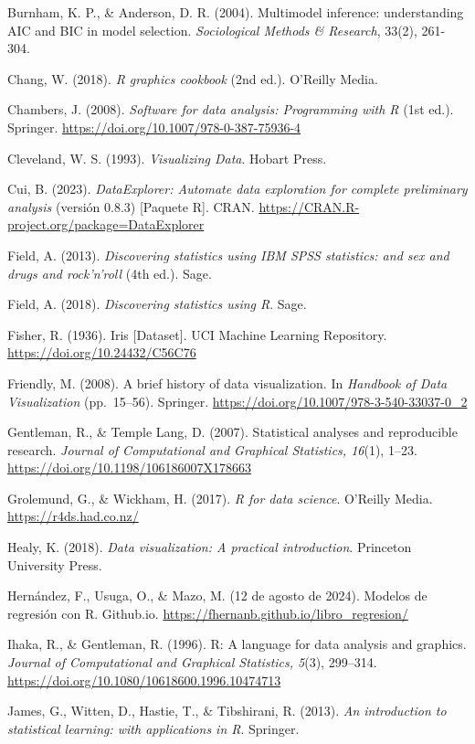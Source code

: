 \documentclass[
  spanish,
  a4paper,
  DIV=11,
  numbers=noendperiod,
  onepage,
  openany]{scrreprt}
\begin{document}
Burnham, K. P., \& Anderson, D. R. (2004). Multimodel inference:
understanding AIC and BIC in model selection. \emph{Sociological Methods
\& Research}, 33(2), 261-304.

Chang, W. (2018). \emph{R graphics cookbook} (2nd ed.). O'Reilly Media.

Chambers, J. (2008). \emph{Software for data analysis: Programming with
R} (1st ed.). Springer. \url{https://doi.org/10.1007/978-0-387-75936-4}

Cleveland, W. S. (1993). \emph{Visualizing Data}. Hobart Press.

Cui, B. (2023). \emph{DataExplorer: Automate data exploration for
complete preliminary analysis} (versión 0.8.3) {[}Paquete R{]}. CRAN.
\url{https://CRAN.R-project.org/package=DataExplorer}

Field, A. (2013). \emph{Discovering statistics using IBM SPSS
statistics: and sex and drugs and rock'n'roll} (4th ed.). Sage.

Field, A. (2018). \emph{Discovering statistics using R}. Sage.

Fisher, R. (1936). Iris {[}Dataset{]}. UCI Machine Learning Repository.
\url{https://doi.org/10.24432/C56C76}

Friendly, M. (2008). A brief history of data visualization. In
\emph{Handbook of Data Visualization} (pp.~15--56). Springer.
\url{https://doi.org/10.1007/978-3-540-33037-0_2}

Gentleman, R., \& Temple Lang, D. (2007). Statistical analyses and
reproducible research. \emph{Journal of Computational and Graphical
Statistics, 16}(1), 1--23.
\url{https://doi.org/10.1198/106186007X178663}

Grolemund, G., \& Wickham, H. (2017). \emph{R for data science}.
O'Reilly Media. \url{https://r4ds.had.co.nz/}

Healy, K. (2018). \emph{Data visualization: A practical introduction}.
Princeton University Press.

Hernández, F., Usuga, O., \& Mazo, M. (12 de agosto de 2024). Modelos de
regresión con R. Github.io.
\url{https://fhernanb.github.io/libro_regresion/}

Ihaka, R., \& Gentleman, R. (1996). R: A language for data analysis and
graphics. \emph{Journal of Computational and Graphical Statistics,
5}(3), 299--314. \url{https://doi.org/10.1080/10618600.1996.10474713}

James, G., Witten, D., Hastie, T., \& Tibshirani, R. (2013). \emph{An
introduction to statistical learning: with applications in R}. Springer.
\end{document}
